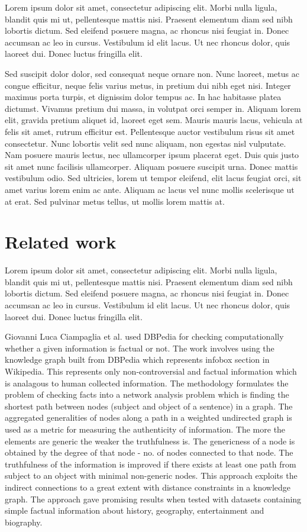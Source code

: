 \documentclass[a4paper, 11pt]{article}
\begin{document}
Lorem ipsum dolor sit amet, consectetur adipiscing elit. Morbi nulla ligula, blandit quis mi ut, pellentesque mattis nisi. Praesent elementum diam sed nibh lobortis dictum. Sed eleifend posuere magna, ac rhoncus nisi feugiat in. Donec accumsan ac leo in cursus. Vestibulum id elit lacus. Ut nec rhoncus dolor, quis laoreet dui. Donec luctus fringilla elit.

Sed suscipit dolor dolor, sed consequat neque ornare non. Nunc laoreet, metus ac congue efficitur, neque felis varius metus, in pretium dui nibh eget nisi. Integer maximus porta turpis, et dignissim dolor tempus ac. In hac habitasse platea dictumst. Vivamus pretium dui massa, in volutpat orci semper in. Aliquam lorem elit, gravida pretium aliquet id, laoreet eget sem. Mauris mauris lacus, vehicula at felis sit amet, rutrum efficitur est. Pellentesque auctor vestibulum risus sit amet consectetur. Nunc lobortis velit sed nunc aliquam, non egestas nisl vulputate. Nam posuere mauris lectus, nec ullamcorper ipsum placerat eget. Duis quis justo sit amet nunc facilisis ullamcorper. Aliquam posuere suscipit urna. Donec mattis vestibulum odio. Sed ultricies, lorem ut tempor eleifend, elit lacus feugiat orci, sit amet varius lorem enim ac ante. Aliquam ac lacus vel nunc mollis scelerisque ut at erat. Sed pulvinar metus tellus, ut mollis lorem mattis at.

\newpage
\section{Related work}
Lorem ipsum dolor sit amet, consectetur adipiscing elit. Morbi nulla ligula, blandit quis mi ut, pellentesque mattis nisi. Praesent elementum diam sed nibh lobortis dictum. Sed eleifend posuere magna, ac rhoncus nisi feugiat in. Donec accumsan ac leo in cursus. Vestibulum id elit lacus. Ut nec rhoncus dolor, quis laoreet dui. Donec luctus fringilla elit.

Giovanni Luca Ciampaglia et al. used DBPedia for checking computationally whether a given information is factual or not. The work involves using the knowledge graph built from DBPedia which represents infobox section in Wikipedia. This represents only non-controversial and factual information which is analagous to human collected information. The methodology formulates the problem of checking facts into a network analysis problem which is finding the shortest path between nodes (subject and object of a sentence) in a graph. The aggregated generalities of nodes along a path in a weighted undirected graph is used as a metric for measuring the authenticity of information. The more the elements are generic the weaker the truthfulness is.  The genericness of a node is obtained by the degree of that node - no. of nodes connected to that node. The truthfulness of the information is improved if there exists at least one path from subject to an object with minimal non-generic nodes. This approach exploits the indirect connections to a great extent with distance constraints in a knowledge graph. The approach gave promising results when tested with datasets containing simple factual information about history, geography, entertainment and biography. 
\end{document}
